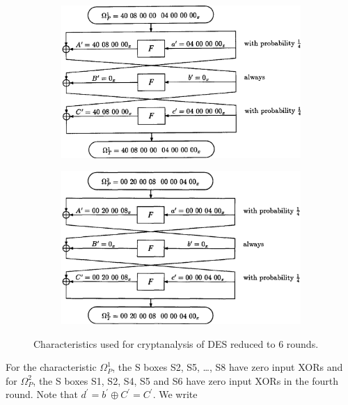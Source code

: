 \documentclass[twoside]{article}
\begin{document}
\begin{figure}[!ht]
    \centering
    \begin{subfigure}{0.45\linewidth}
        \includegraphics[width=\linewidth]{images/des_6round_char1.png}
        \label{fig:des-6-char1}
    \end{subfigure}
    \hfill
    \begin{subfigure}{0.45\linewidth}
        \includegraphics[width=\linewidth]{images/des_6round_char2.png}
        \label{fig:des-6-char2}
    \end{subfigure}
    \caption{Characteristics used for cryptanalysis of DES reduced to 6 rounds.}
    \label{fig:des-6-char}
\end{figure}

For the characteristic \(\Omega_P^1\), the S boxes S2, S5, \dots, S8 have zero
input XORs and for \(\Omega_P^2\), the S boxes S1, S2, S4, S5 and S6 have zero
input XORs in the fourth round. Note that \(d^\prime = b^\prime \oplus C^\prime
= C^\prime\). We write
\end{document}
